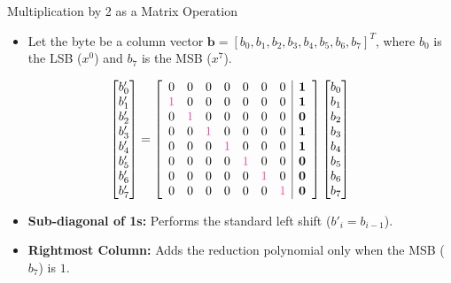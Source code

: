 \documentclass{cubeamer}
\begin{document}
\begin{frame}{Multiplication by 2 as a Matrix Operation}
    \begin{itemize}
        \item Let the byte be a column vector $\mathbf{b} = [b_0, b_1, b_2, b_3, b_4, b_5, b_6, b_7]^T$, where $b_0$ is the LSB ($x^0$) and $b_7$ is the MSB ($x^7$).
    \end{itemize}
    
    \[
    \begin{bmatrix}
    b'_0 \\ b'_1 \\ b'_2 \\ b'_3 \\ b'_4 \\ b'_5 \\ b'_6 \\ b'_7
    \end{bmatrix}
    =
    \left[
    \begin{array}{ccccccc|c}
    0 & 0 & 0 & 0 & 0 & 0 & 0 & \mathbf{1} \\
    \red{1} & 0 & 0 & 0 & 0 & 0 & 0 & \mathbf{1} \\
    0 & \red{1} & 0 & 0 & 0 & 0 & 0 & \mathbf{0} \\
    0 & 0 & \red{1} & 0 & 0 & 0 & 0 & \mathbf{1} \\
    0 & 0 & 0 & \red{1} & 0 & 0 & 0 & \mathbf{1} \\
    0 & 0 & 0 & 0 & \red{1} & 0 & 0 & \mathbf{0} \\
    0 & 0 & 0 & 0 & 0 & \red{1} & 0 & \mathbf{0} \\
    0 & 0 & 0 & 0 & 0 & 0 & \red{1} & \mathbf{0}
    \end{array}
    \right]
    \begin{bmatrix}
    b_0 \\ b_1 \\ b_2 \\ b_3 \\ b_4 \\ b_5 \\ b_6 \\ b_7
    \end{bmatrix}
    \]
    \begin{itemize}
        \item \textbf{Sub-diagonal of 1s:} Performs the standard left shift ($b'_i = b_{i-1}$).
        \item \textbf{Rightmost Column:} Adds the reduction polynomial only when the MSB ($b_7$) is $1$.
    \end{itemize}
\end{frame}
\end{document}
